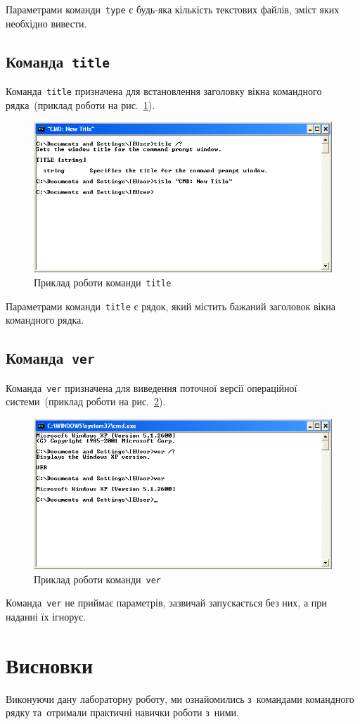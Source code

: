 \documentclass[
	a4paper,
	oneside,
	DIV = 12,
	fontsize = 13pt,
	headings = normal,
]{scrartcl}
\newcommand{\progname}[1]{\texttt{#1}}
\begin{document}
			Параметрами команди~\progname{type} є будь-яка кількість текстових файлів, зміст яких необхідно вивести.

		\subsection{Команда~\progname{title}}
			Команда~\progname{title} призначена для встановлення заголовку вікна командного рядка~(приклад роботи на рис.~\ref{fig:title-usage}).

			\begin{figure}[!htbp]
				\centering
				\includegraphics[height = 6\baselineskip]{../01-solution/y03s01-pcdiag-lab-06-p06.png}
				\caption{Приклад роботи команди~\progname{title}}
				\label{fig:title-usage}
			\end{figure}

			Параметрами команди~\progname{title} є рядок, який містить бажаний заголовок вікна командного рядка.

		\subsection{Команда~\progname{ver}}
			Команда~\progname{ver} призначена для виведення поточної версії операційної системи~(приклад роботи на рис.~\ref{fig:ver-usage}).

			\begin{figure}[!htbp]
				\centering
				\includegraphics[height = 6\baselineskip]{../01-solution/y03s01-pcdiag-lab-06-p07.png}
				\caption{Приклад роботи команди~\progname{ver}}
				\label{fig:ver-usage}
			\end{figure}

			Команда~\progname{ver} не приймає параметрів, зазвичай запускається без них, а при наданні їх ігнорує.

	\section{Висновки}
		Виконуючи дану лабораторну роботу, ми ознайомились з~командами командного рядку та~отримали практичні навички роботи з~ними.
\end{document}
